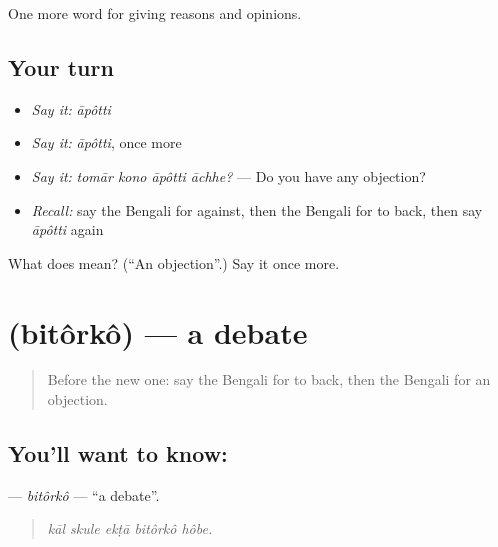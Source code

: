 \begin{grammarlens}[title={What you've built}]
One more word for giving reasons and opinions.
\end{grammarlens}

\subsection*{Your turn}
\begin{itemize}
\raggedright
  \item \emph{Say it:} \emph{āpôtti}
  \item \emph{Say it:} \emph{āpôtti}, once more
  \item \emph{Say it:} \emph{tomār kono āpôtti āchhe?} — Do you have any objection?
  \item \emph{Recall:} say the Bengali for against, then the Bengali for to back, then say \emph{āpôtti} again
\end{itemize}

\begin{tcolorbox}[breakable,colback=teal!4,colframe=teal!35!black,title={Before you move on}]
What does  mean? (\textquotedblleft{}An objection\textquotedblright{}.) Say it once more.
\end{tcolorbox}
\section[\texorpdfstring{\bn{বিতর্ক} (bitôrkô)}{বিতর্ক (bitôrkô)}]{ (bitôrkô) — a debate}

\label{lesson:BN-C334-bitorko}



\begin{quote}
Before the new one: say the Bengali for to back, then the Bengali for an objection.
\end{quote}

\subsection*{You'll want to know: }
\textbf{} — \emph{bitôrkô} — \textquotedblleft{}a debate\textquotedblright{}.

\begin{quote}
    
\end{quote}

\begin{quote}
\emph{kāl skule ekṭā bitôrkô hôbe.}
\end{quote}


